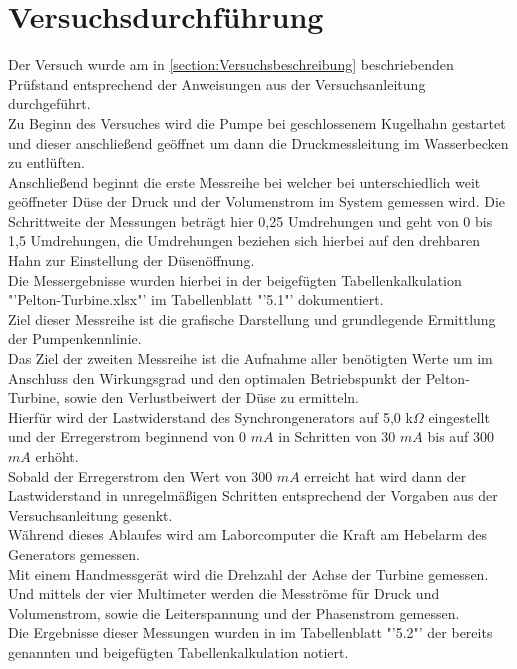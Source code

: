 \section{Versuchsdurchführung}
Der Versuch wurde am in \autoref{section:Versuchsbeschreibung} beschriebenden Prüfstand entsprechend der Anweisungen aus der Versuchsanleitung \cite[S.11-14]{Anleitung} durchgeführt.\\
Zu Beginn des Versuches wird die Pumpe bei geschlossenem Kugelhahn gestartet und dieser anschließend geöffnet um dann die Druckmessleitung im Wasserbecken zu entlüften.\\
Anschließend beginnt die erste Messreihe bei welcher bei unterschiedlich weit geöffneter Düse der Druck und der Volumenstrom im System gemessen wird.
Die Schrittweite der Messungen beträgt hier 0,25 Umdrehungen und geht von 0 bis 1,5 Umdrehungen, die Umdrehungen beziehen sich hierbei auf den drehbaren Hahn zur Einstellung der Düsenöffnung.\\
Die Messergebnisse wurden hierbei in der beigefügten Tabellenkalkulation "'Pelton-Turbine.xlsx"' im Tabellenblatt "'5.1"' dokumentiert.\\
Ziel dieser Messreihe ist die grafische Darstellung und grundlegende Ermittlung der Pumpenkennlinie.\\
\newline
Das Ziel der zweiten Messreihe ist die Aufnahme aller benötigten Werte um im Anschluss den Wirkungsgrad und den optimalen Betriebspunkt der Pelton-Turbine,
 sowie den Verlustbeiwert der Düse zu ermitteln.\\
 Hierfür wird der Lastwiderstand des Synchrongenerators auf 5,0 k$\Omega$ eingestellt und der Erregerstrom beginnend von 0 $mA$ in Schritten von 30 $mA$ bis auf 300 $mA$ erhöht.\\
 Sobald der Erregerstrom den Wert von 300 $mA$ erreicht hat wird dann der Lastwiderstand in unregelmäßigen Schritten entsprechend der Vorgaben aus der Versuchsanleitung \cite[S.12]{Anleitung} gesenkt.\\
 Während dieses Ablaufes wird am Laborcomputer die Kraft am Hebelarm des Generators gemessen.\\
 Mit einem Handmessgerät wird die Drehzahl der Achse der Turbine gemessen.\\
 Und mittels der vier Multimeter werden die Mesströme für Druck und Volumenstrom, sowie die Leiterspannung und der Phasenstrom gemessen.\\
 Die Ergebnisse dieser Messungen wurden in im Tabellenblatt "'5.2"' der bereits genannten und beigefügten Tabellenkalkulation notiert.\\
